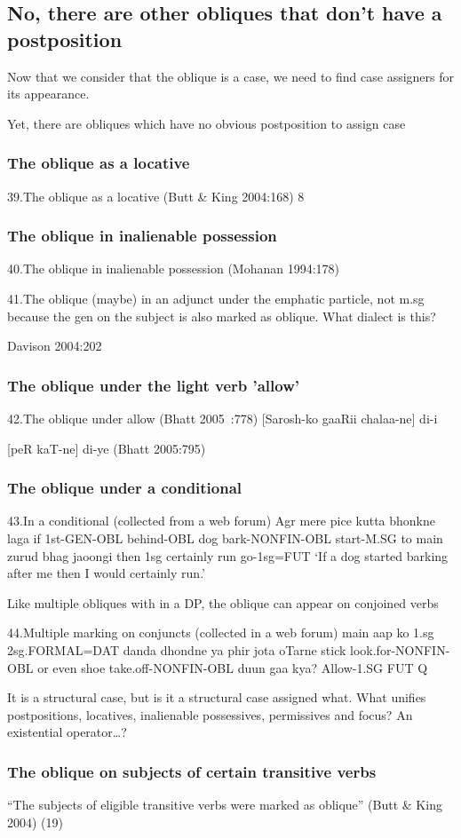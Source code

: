\documentclass{article}
\begin{document}
\subsection{No, there are other obliques that don't have a postposition}

Now that we consider that the oblique is a case, we need to find case assigners for its appearance.

Yet, there are obliques which have no obvious postposition to assign case

\subsubsection{The oblique as a locative}
39.The oblique as a locative (Butt \& King 2004:168) 8


\subsubsection{The oblique in inalienable possession}
40.The oblique in inalienable possession  (Mohanan 1994:178)


41.The oblique (maybe) in an adjunct under the  emphatic particle, not m.sg because the gen on the subject is also marked as oblique. What dialect is this?


Davison 2004:202

\subsubsection{The oblique under the light verb 'allow'}
42.The oblique under allow (Bhatt 2005 :778)
[Sarosh-ko gaaRii chalaa-ne] di-i

[peR kaT-ne] di-ye (Bhatt 2005:795)

\subsubsection{The oblique under a conditional}
43.In a conditional (collected from a web forum)
  Agr mere   pice  kutta  bhonkne   laga
  if 1st-GEN-OBL behind-OBL dog  bark-NONFIN-OBL start-M.SG
to  main  zurud   bhag  jaoongi
then  1sg  certainly  run  go-1sg=FUT
  `If a dog started barking after me then I would certainly run.'




Like multiple obliques with in a DP, the oblique can appear on conjoined verbs

44.Multiple marking on conjuncts (collected in a web forum)
main aap ko
1.sg 2sg.FORMAL=DAT
danda dhondne   ya phir  jota oTarne
stick look.for-NONFIN-OBL or even  shoe take.off-NONFIN-OBL
duun  gaa  kya?
Allow-1.SG FUT Q

It is a structural case, but is it a structural case assigned what. What unifies postpositions, locatives, inalienable possessives, permissives and focus?
An existential operator…?


\subsubsection{The oblique on subjects of certain transitive verbs}

``The subjects of eligible transitive verbs were marked as oblique” (Butt \& King 2004) (19)
\end{document}

